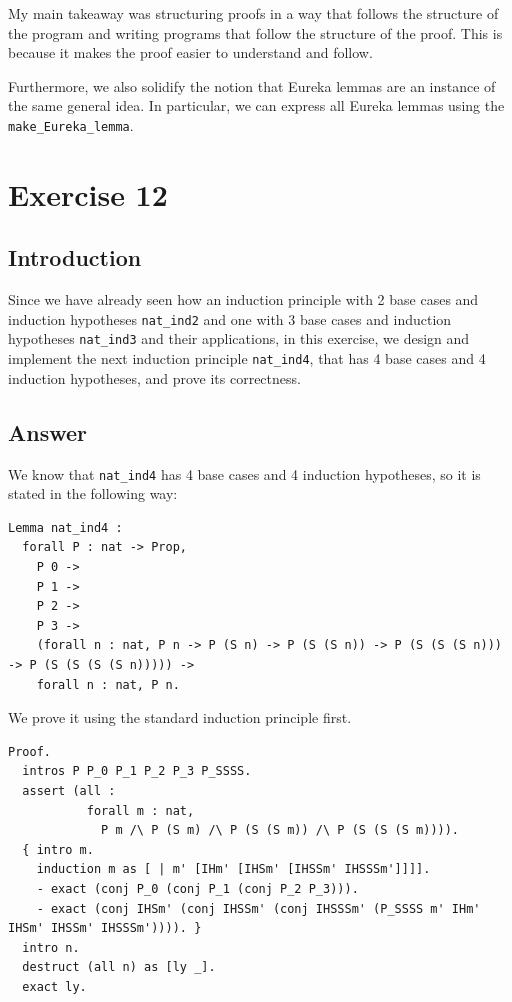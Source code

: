 \documentclass{article}
\begin{document}
My main takeaway was structuring proofs in a way that follows the structure of the program and writing programs that follow the structure of the proof. This is because it makes the proof easier to understand and follow.

Furthermore, we also solidify the notion that Eureka lemmas are an instance of the same general idea. In particular, we can express all Eureka lemmas using the \texttt{make\_Eureka\_lemma}.

\newpage

\section{Exercise 12}
\subsection{Introduction}
Since we have already seen how an induction principle with 2 base cases and induction hypotheses \texttt{nat\_ind2} and one with 3 base cases and induction hypotheses \texttt{nat\_ind3} and their applications, in this exercise, we design and implement the next induction principle \texttt{nat\_ind4}, that has 4 base cases and 4 induction hypotheses, and prove its correctness.

\subsection{Answer}
We know that \texttt{nat\_ind4} has 4 base cases and 4 induction hypotheses, so it is stated in the following way:

\begin{lstlisting}
Lemma nat_ind4 :
  forall P : nat -> Prop,
    P 0 ->
    P 1 ->
    P 2 ->
    P 3 ->
    (forall n : nat, P n -> P (S n) -> P (S (S n)) -> P (S (S (S n))) -> P (S (S (S (S n))))) ->
    forall n : nat, P n.
\end{lstlisting}

We prove it using the standard induction principle first.

\begin{lstlisting}
Proof.
  intros P P_0 P_1 P_2 P_3 P_SSSS.
  assert (all :
           forall m : nat,
             P m /\ P (S m) /\ P (S (S m)) /\ P (S (S (S m)))).
  { intro m.
    induction m as [ | m' [IHm' [IHSm' [IHSSm' IHSSSm']]]].
    - exact (conj P_0 (conj P_1 (conj P_2 P_3))).
    - exact (conj IHSm' (conj IHSSm' (conj IHSSSm' (P_SSSS m' IHm' IHSm' IHSSm' IHSSSm')))). }
  intro n.
  destruct (all n) as [ly _].
  exact ly.
\end{lstlisting}
\end{document}
